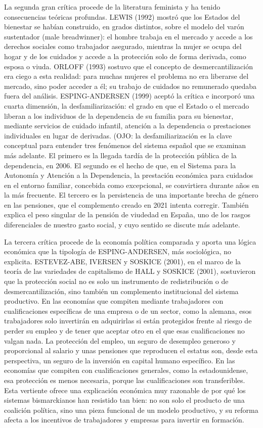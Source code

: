 \documentclass[10pt,a4paper]{article}
\begin{document}
La segunda gran crítica procede de la literatura feminista y ha tenido consecuencias teóricas profundas. LEWIS (1992) mostró que los Estados del bienestar se habían construido, en grados distintos, sobre el modelo del varón sustentador (male breadwinner): el hombre trabaja en el mercado y accede a los derechos sociales como trabajador asegurado, mientras la mujer se ocupa del hogar y de los cuidados y accede a la protección solo de forma derivada, como esposa o viuda. ORLOFF (1993) sostuvo que el concepto de desmercantilización era ciego a esta realidad: para muchas mujeres el problema no era liberarse del mercado, sino poder acceder a él; su trabajo de cuidados no remunerado quedaba fuera del análisis. ESPING-ANDERSEN (1999) aceptó la crítica e incorporó una cuarta dimensión, la desfamiliarización: el grado en que el Estado o el mercado liberan a los individuos de la dependencia de su familia para su bienestar, mediante servicios de cuidado infantil, atención a la dependencia o prestaciones individuales en lugar de derivadas. (OJO: la desfamiliarización es la clave conceptual para entender tres fenómenos del sistema español que se examinan más adelante. El primero es la llegada tardía de la protección pública de la dependencia, en 2006. El segundo es el hecho de que, en el Sistema para la Autonomía y Atención a la Dependencia, la prestación económica para cuidados en el entorno familiar, concebida como excepcional, se convirtiera durante años en la más frecuente. El tercero es la persistencia de una importante brecha de género en las pensiones, que el complemento creado en 2021 intenta corregir. También explica el peso singular de la pensión de viudedad en España, uno de los rasgos diferenciales de nuestro gasto social, y cuyo sentido se discute más adelante.

La tercera crítica procede de la economía política comparada y aporta una lógica económica que la tipología de ESPING-ANDERSEN, más sociológica, no explicita. ESTEVEZ-ABE, IVERSEN y SOSKICE (2001), en el marco de la teoría de las variedades de capitalismo de HALL y SOSKICE (2001), sostuvieron que la protección social no es solo un instrumento de redistribución o de desmercantilización, sino también un complemento institucional del sistema productivo. En las economías que compiten mediante trabajadores con cualificaciones específicas de una empresa o de un sector, como la alemana, esos trabajadores solo invertirán en adquirirlas si están protegidos frente al riesgo de perder su empleo y de tener que aceptar otro en el que esas cualificaciones no valgan nada. La protección del empleo, un seguro de desempleo generoso y proporcional al salario y unas pensiones que reproducen el estatus son, desde esta perspectiva, un seguro de la inversión en capital humano específico. En las economías que compiten con cualificaciones generales, como la estadounidense, esa protección es menos necesaria, porque las cualificaciones son transferibles. Esta vertiente ofrece una explicación económica muy razonable de por qué los sistemas bismarckianos han resistido tan bien: no son solo el producto de una coalición política, sino una pieza funcional de un modelo productivo, y su reforma afecta a los incentivos de trabajadores y empresas para invertir en formación.
\end{document}
